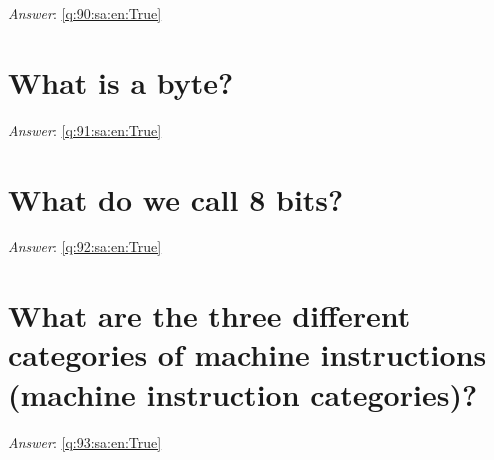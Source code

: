 \documentclass[a4paper,11pt,oneside]{book}
\begin{document}
\begin{sloppypar}
\label{q:90:sa:en:False}

\vspace{2cm}

\noindent\makebox[\textwidth]{\hrulefill}

\vspace{1cm}

\textit{Answer}: \autoref{q:90:sa:en:True}



\section{What is a byte?}

\label{q:91:sa:en:False}

\vspace{2cm}

\noindent\makebox[\textwidth]{\hrulefill}

\vspace{1cm}

\textit{Answer}: \autoref{q:91:sa:en:True}



\section{What do we call 8 bits?}

\label{q:92:sa:en:False}

\vspace{2cm}

\noindent\makebox[\textwidth]{\hrulefill}

\vspace{1cm}

\textit{Answer}: \autoref{q:92:sa:en:True}



\section{What are the three different categories of machine instructions (machine instruction categories)?}

\label{q:93:sa:en:False}

\vspace{2cm}

\noindent\makebox[\textwidth]{\hrulefill}

\vspace{1cm}

\textit{Answer}: \autoref{q:93:sa:en:True}




\end{sloppypar}
\end{document}
